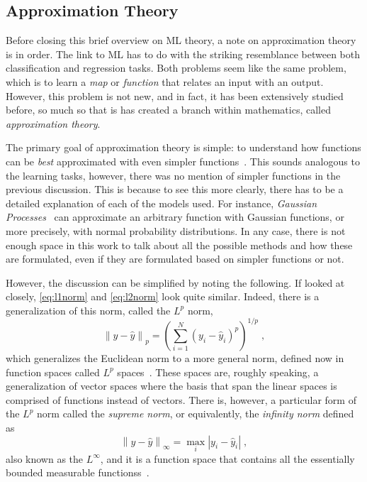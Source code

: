\subsection{Approximation Theory}
Before closing this brief overview on ML theory, a note on approximation theory is in 
order. The link to ML has to do with the striking resemblance between both classification 
and regression tasks. Both problems seem like the same problem, which is to learn a \emph{map} or \emph{function} that relates an input with an output. However, this problem is not 
new, and in fact, it has been extensively studied before, so much so that is has created a 
branch within mathematics, called \emph{approximation theory}.

The primary goal of approximation theory is simple: to understand how functions can be \emph{best} approximated with even simpler functions~\cite{trefethenApproximationTheoryApproximation2013}. This sounds analogous to the learning tasks, however, there was no mention of simpler functions in the previous discussion. This is because to see this more clearly, there has to be a detailed explanation of each of the models used. For instance, \emph{Gaussian Processes}~\cite{rasmussenGaussianProcessesMachine2006} can approximate an arbitrary function with Gaussian functions, or more precisely, with normal probability distributions. In any case, there is not enough space in this work to talk about all the possible methods and how these are formulated, even if they are formulated based on simpler functions or not.

However, the discussion can be simplified by noting the following. If looked at closely,
\autoref{eq:l1norm} and \autoref{eq:l2norm} look quite similar. Indeed, there is a generalization of this norm, called the $L^p$ norm,
\begin{equation}
    { \left\lVert y - \hat{y} \right\rVert }_{p} = { \left( \sum_{i=1}^{N} { \left(y_i - \hat{y}_i \right) }^{p} \right) }^{1/p}
    \; ,
    \label{eq:lp-norm}
\end{equation}
which generalizes the Euclidean norm to a more general norm, defined now in function spaces 
called $L^p$ spaces~\cite{rudinPrinciplesMathematicalAnalysis2013}. These spaces are, 
roughly speaking, a generalization of vector spaces where the basis that span the linear 
spaces is comprised of functions instead of vectors. There is, however, a particular form of the $L^p$ norm called the \emph{supreme norm}, or equivalently, the \emph{infinity norm} defined as
\begin{equation}
    { \left\lVert y - \hat{y} \right\rVert }_{\infty} = 
    \underset{i}{\max}{\left\lvert y_i - \hat{y}_{i} \right\rvert}
    \; ,
    \label{eq:linf-norm}
\end{equation}
also known as the $L^{\infty}$, and it is a function space that contains all the essentially bounded measurable functionss~\cite{taoIntroductionMeasureTheory2011}.

